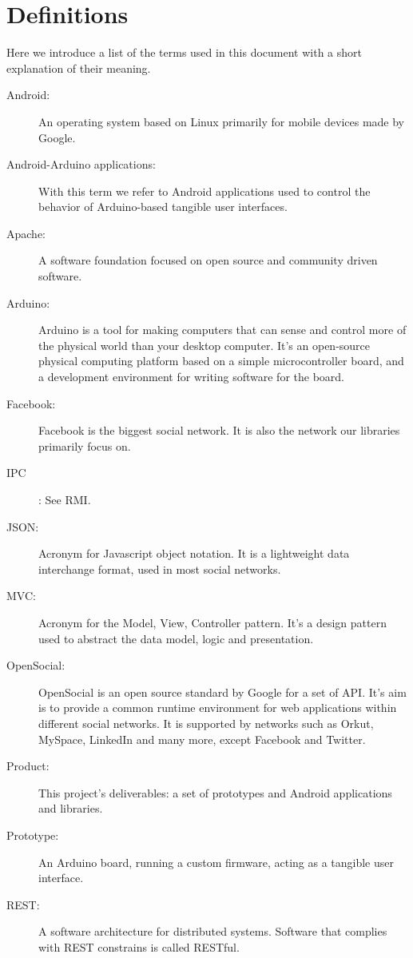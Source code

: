 \section{Definitions}

Here we introduce a list of the terms used in this document with a short explanation of their meaning.

\begin{description}

\item[Android:]
	An operating system based on Linux primarily for mobile devices made by Google.
\item[Android-Arduino applications:]
	With this term we refer to Android applications used to control the behavior of Arduino-based tangible user interfaces.
\item[Apache:]
	A software foundation focused on open source and community driven software.
\item[Arduino:]
	Arduino is a tool for making computers that can sense and control more of the physical world than your
	desktop computer. It's an open-source physical computing platform based on a simple microcontroller board, and a development
	environment for writing software for the board. 
\item[Facebook:]
	Facebook is the biggest social network. It is also the network our libraries primarily focus on.
\item[IPC]:
	See RMI.
\item[JSON:]
	Acronym for Javascript object notation. It is a lightweight data interchange format,
	used in most social networks.
\item[MVC:]
	Acronym for the Model, View, Controller pattern. It's a design pattern used to abstract the data model, logic and presentation.
\item[OpenSocial:]
	OpenSocial is an open source standard by Google for a set of API. It's aim is to
	provide a common runtime environment for web applications within different social networks. It is supported by networks
	such as Orkut, MySpace, LinkedIn and many more, except Facebook and Twitter.
\item[Product:]
	This project's deliverables: a set of prototypes and Android applications and libraries.
\item[Prototype:]
	An Arduino board, running a custom firmware, acting as a tangible user interface.
\item[REST:]
	A software architecture for distributed systems. Software that complies with REST constrains is called RESTful.

\end{description}
